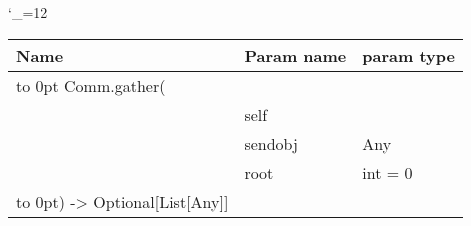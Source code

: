 \begingroup \catcode`\_=12 \tt
\begin{tabular}{lll}
\toprule
\textrm{Name}&\textrm{Param name}&\textrm{param type}\\
\midrule
\hbox to 0pt {Comm.gather(\hss}\\
& self\\
& sendobj & Any\\
& root & int = 0\\
\hbox to 0pt{) -> Optional[List[Any]]\hss}\\
\bottomrule
\end{tabular}
\endgroup
